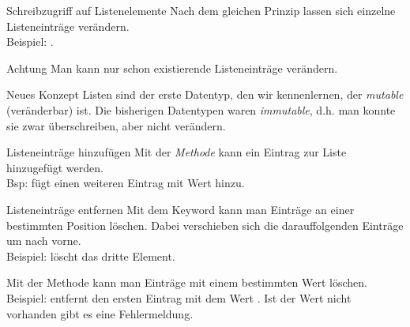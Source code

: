 \begin{frame}
\begin{block}{Schreibzugriff auf Listenelemente}
\vspace{2pt}
Nach dem gleichen Prinzip lassen sich einzelne Listeneinträge verändern. \\
Beispiel: . 
\end{block}

\pause 
\vspace{12pt}



\begin{alertblock}{Achtung}
\vspace{2pt}
Man kann nur schon existierende Listeneinträge verändern. 
\end{alertblock}

\pause 
\vspace{12pt}



\begin{exampleblock}{Neues Konzept}
\vspace{2pt}
Listen sind der erste Datentyp, den wir kennenlernen, der \emph{mutable} (veränderbar) ist. Die bisherigen Datentypen waren \emph{immutable}, d.h. man konnte sie zwar überschreiben, aber nicht verändern. 
\end{exampleblock}

\end{frame}

\begin{frame}
	
\begin{block}{Listeneinträge hinzufügen}
	\vspace{2pt}
	Mit der \emph{Methode}  kann ein Eintrag zur Liste hinzugefügt werden. \\ 
	Bsp:  fügt einen weiteren Eintrag mit Wert  hinzu. 
\end{block}	

\pause 
\vspace{12pt}


\begin{block}{Listeneinträge entfernen}
	\pause 
\vspace{2pt}
Mit dem Keyword  kann man Einträge an einer bestimmten Position löschen. Dabei verschieben sich die darauffolgenden Einträge um  nach vorne. \\
Beispiel:  löscht das dritte Element.  

\pause 

Mit der Methode  kann man Einträge mit einem bestimmten Wert löschen. \\
Beispiel:  entfernt den ersten Eintrag mit dem Wert . Ist der Wert nicht vorhanden gibt es eine Fehlermeldung. 
\end{block}
\end{frame}

